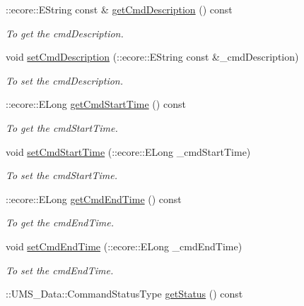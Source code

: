 \begin{DoxyCompactItemize}
::ecore::EString const \& \hyperlink{classUMS__Data_1_1Command_a0be53d1a263bae6f5967f5d3064eee3a}{getCmdDescription} () const 
\begin{DoxyCompactList}\small\item\em To get the cmdDescription. \item\end{DoxyCompactList}\item 
void \hyperlink{classUMS__Data_1_1Command_af2a848820c516ce55a54375d275c33de}{setCmdDescription} (::ecore::EString const \&\_\-cmdDescription)
\begin{DoxyCompactList}\small\item\em To set the cmdDescription. \item\end{DoxyCompactList}\item 
::ecore::ELong \hyperlink{classUMS__Data_1_1Command_ab85d89f247bd91683d526e63b78c10e9}{getCmdStartTime} () const 
\begin{DoxyCompactList}\small\item\em To get the cmdStartTime. \item\end{DoxyCompactList}\item 
void \hyperlink{classUMS__Data_1_1Command_a8ea4e21e6b576dc1de3b3ef1a88448d5}{setCmdStartTime} (::ecore::ELong \_\-cmdStartTime)
\begin{DoxyCompactList}\small\item\em To set the cmdStartTime. \item\end{DoxyCompactList}\item 
::ecore::ELong \hyperlink{classUMS__Data_1_1Command_a8ce2ee67b02e572490af6a803129d85b}{getCmdEndTime} () const 
\begin{DoxyCompactList}\small\item\em To get the cmdEndTime. \item\end{DoxyCompactList}\item 
void \hyperlink{classUMS__Data_1_1Command_a5b75d77a48a6384a7cb0a3c0ebde745b}{setCmdEndTime} (::ecore::ELong \_\-cmdEndTime)
\begin{DoxyCompactList}\small\item\em To set the cmdEndTime. \item\end{DoxyCompactList}\item 
::UMS\_\-Data::CommandStatusType \hyperlink{classUMS__Data_1_1Command_ab850acaeb0a87305e1f9e3b6a653c28f}{getStatus} () const 

\end{DoxyCompactItemize}
